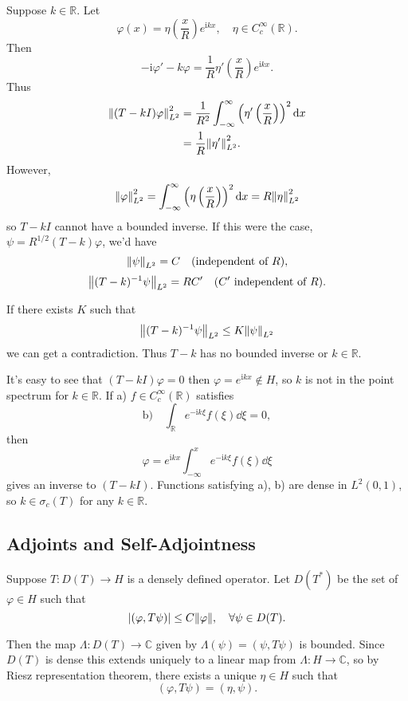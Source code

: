 \documentclass[a4paper,11pt]{article}
\begin{document}
\begin{ex}
		Suppose $k \in \mathbb{R}$. Let 
		\[
			\varphi(x) = \eta \left( \frac{x}{R} \right) e ^{\mathrm{i} k x}, \quad \eta \in C ^{\infty}_c (\mathbb{R}).
		\]
		Then 
		\[
			- \mathrm{i} \varphi' - k \varphi = \frac{1}{R} \eta' \left( \frac{x}{R} \right) e ^{\mathrm{i} k x}.
		\]
		Thus
		\begin{align*}
			\norm{(T - k I)\varphi}_{L^2}^2 & = \frac{1}{R^2} \int_{-\infty}^{\infty} \left( \eta' \left( \frac{x}{R} \right) \right) ^2 \dd{x}\\
			& = \frac{1}{R} \norm{\eta'}^2 _{L^2}.
		\end{align*}
		However, 
		\begin{align*}
			\norm{\varphi}_{L^2}^2 = \int_{-\infty}^{\infty} \left( \eta \left( \frac{x}{R} \right) \right)^2 \dd{x} = R \norm{\eta}_{L^2}^2
		\end{align*}
		so $T - kI$ cannot have a bounded inverse. If this were the case, $\psi = R ^{1/2} (T - k)\varphi$, we'd have
		\[
			\norm{\psi}_{L^2} = C \quad \text{(independent of $R$)},
		\]
		\[
			\norm{(T - k)^{-1} \psi} _{L^2} = R C' \quad \text{($C'$ independent of $R$)}.
		\]
		 
		If there exists $K$ such that 
		\[
			\norm{(T - k)^{-1} \psi}_{L^2} \leq K \norm{\psi}_{L^2}
		\]
		we can get a contradiction. Thus $T - k$ has no bounded inverse or $k \in \mathbb{R}$.

		It's easy to see that $(T - kI) \varphi = 0$ then $\varphi = e ^{\mathrm{i} kx} \not \in H$, so $k$ is not in the point spectrum for $k \in \mathbb{R}$. If a) $f \in C ^{\infty}_c (\mathbb{R})$ satisfies 
		\[
			\text{b)} \quad \int _{\mathbb{R}} e ^{- \mathrm{i} k \xi}f(\xi) \dd{\xi} = 0,
		\]
		then 
		\[
			\varphi = e ^{\mathrm{i} kx} \int_{-\infty}^{x} e ^{- \mathrm{i} k \xi} f(\xi) \dd{\xi}
		\]
		gives an inverse to $(T - kI)$. Functions satisfying a), b) are dense in $L^2(0,1)$, so $k\in \sigma_c(T)$ for any $k\in \mathbb{R}$.
	\end{ex}

	\subsection{Adjoints and Self-Adjointness}

	Suppose $T : D(T) \to H$ is a densely defined operator. Let $D(T^*)$ be the set of $\varphi \in H$ such that 
	\[
		\abs{(\varphi, T \psi)} \leq C \norm{\varphi}, \quad \forall \psi \in D(T).
	\]
	
	Then the map $\Lambda : D(T) \to \mathbb{C}$ given by $\Lambda(\psi) = (\psi, T \psi)$ is bounded. Since $D(T)$ is dense this extends uniquely to a linear map from $\Lambda : H \to \mathbb{C}$, so by Riesz representation theorem, there exists a unique $\eta \in H$ such that 
	\[
		(\varphi, T \psi) = (\eta, \psi).
	\]
	
\end{document}

